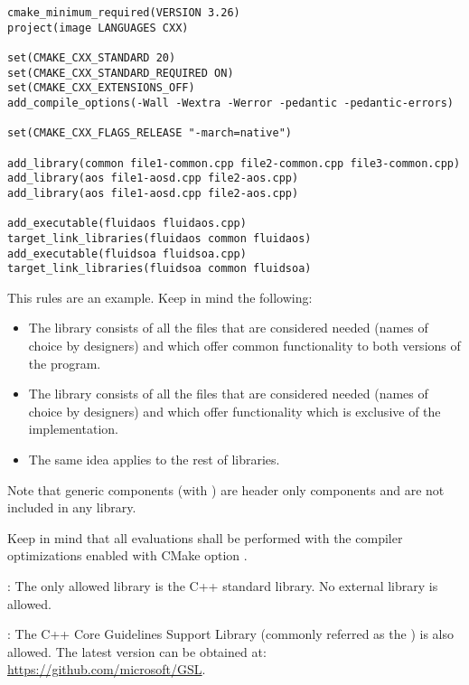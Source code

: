 \begin{lstlisting}[title={CmakeLists.txt},frame=single]
cmake_minimum_required(VERSION 3.26)
project(image LANGUAGES CXX)

set(CMAKE_CXX_STANDARD 20)
set(CMAKE_CXX_STANDARD_REQUIRED ON)
set(CMAKE_CXX_EXTENSIONS_OFF)
add_compile_options(-Wall -Wextra -Werror -pedantic -pedantic-errors)

set(CMAKE_CXX_FLAGS_RELEASE "-march=native")

add_library(common file1-common.cpp file2-common.cpp file3-common.cpp)
add_library(aos file1-aosd.cpp file2-aos.cpp)
add_library(aos file1-aosd.cpp file2-aos.cpp)

add_executable(fluidaos fluidaos.cpp)
target_link_libraries(fluidaos common fluidaos)
add_executable(fluidsoa fluidsoa.cpp)
target_link_libraries(fluidsoa common fluidsoa)
\end{lstlisting}

This rules are an example. Keep in mind the following:

\begin{itemize}

  \item The library  consists of all the  files
        that are considered needed (names of choice by designers) and
        which offer common functionality to both versions of the program.

  \item The library  consists of all the  files
        that are considered needed (names of choice by designers) and
        which offer functionality which is exclusive of the
         implementation.

  \item The same idea applies to the rest of libraries.

\end{itemize}

Note that generic components (with ) are header only components and
are not included in any library.

Keep in mind that all evaluations shall be performed with the compiler optimizations
enabled with CMake option
.

: 
The only allowed library is the C++ standard library.
No external library is allowed.

: The C++ Core Guidelines Support Library (commonly referred as
the ) is also allowed. The latest version can be obtained at:
\url{https://github.com/microsoft/GSL}.

